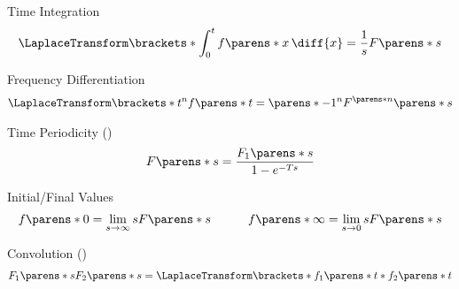 \begin{multicols}{2}
\begin{CheatsheetEntryFrameStart}
\begin{center}
            Time Integration
            \begin{gather*}
                \LaplaceTransform\brackets*{\int_0^t f\parens*{x} \,\diff{x}}
                = \frac{1}{s} F\parens*{s}
            \end{gather*}

            Frequency Differentiation
            \begin{gather*}
                \LaplaceTransform\brackets*{t^n f\parens*{t}}
                = \parens*{-1}^n F^{\parens*{n}}\parens*{s}
            \end{gather*}
        \end{center}

    \end{CheatsheetEntryFrameStart}

    \begin{CheatsheetEntryFrameEnd}

        \begin{center}
            Time Periodicity ()
            \begin{gather*}
                F\parens*{s}
                = \frac{F_1\parens*{s}}{1 - e^{-T s}}
            \end{gather*}

            Initial/Final Values
            \begin{gather*}
                f\parens*{0}
                = \lim_{s \to \infty} s F\parens*{s}
                \qquad\quad
                f\parens*{\infty}
                = \lim_{s \to 0} s F\parens*{s}
            \end{gather*}

            Convolution ()
            \begin{gather*}
                F_1\parens*{s} F_2\parens*{s}
                = \LaplaceTransform\brackets*{f_1\parens*{t} * f_2\parens*{t}}
            \end{gather*}
        \end{center}

    \end{CheatsheetEntryFrameEnd}
    
\end{multicols}


